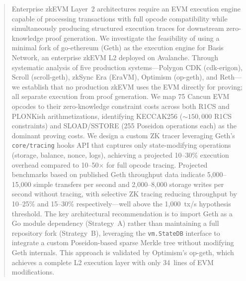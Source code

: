
\begin{abstract}
Enterprise zkEVM Layer~2 architectures require an EVM execution engine capable of
processing transactions with full opcode compatibility while simultaneously producing
structured execution traces for downstream zero-knowledge proof generation. We
investigate the feasibility of using a minimal fork of go-ethereum (Geth) as the
execution engine for Basis Network, an enterprise zkEVM L2 deployed on Avalanche.
Through systematic analysis of five production systems---Polygon CDK (cdk-erigon),
Scroll (scroll-geth), zkSync Era (EraVM), Optimism (op-geth), and Reth---we
establish that no production zkEVM uses the EVM directly for proving; all separate
execution from proof generation. We map 75 Cancun EVM opcodes to their
zero-knowledge constraint costs across both R1CS and PLONKish arithmetizations,
identifying KECCAK256 (${\sim}150{,}000$ R1CS constraints) and SLOAD/SSTORE (255
Poseidon operations each) as the dominant proving costs. We design a custom ZK
tracer leveraging Geth's \texttt{core/tracing} hooks API that captures only
state-modifying operations (storage, balance, nonce, logs), achieving a projected
10--30\% execution overhead compared to 10--50$\times$ for full opcode tracing.
Projected benchmarks based on published Geth throughput data indicate 5{,}000--15{,}000
simple transfers per second and 2{,}000--8{,}000 storage writes per second without
tracing, with selective ZK tracing reducing throughput by 10--25\% and 15--30\%
respectively---well above the 1{,}000~tx/s hypothesis threshold. The key
architectural recommendation is to import Geth as a Go module dependency (Strategy~A)
rather than maintaining a full repository fork (Strategy~B), leveraging the
\texttt{vm.StateDB} interface to integrate a custom Poseidon-based sparse Merkle tree
without modifying Geth internals. This approach is validated by Optimism's op-geth,
which achieves a complete L2 execution layer with only 34~lines of EVM modifications.
\end{abstract}
